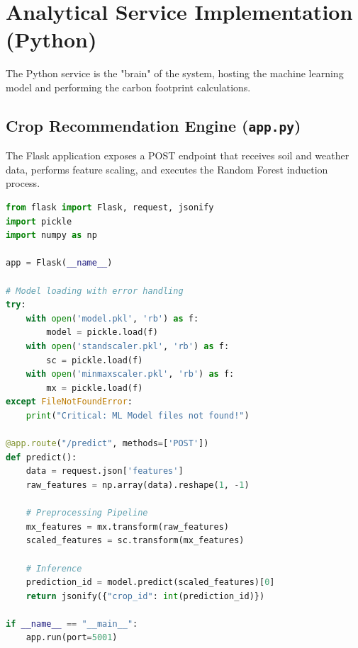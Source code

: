 \documentclass[12pt,a4paper]{report}
\begin{document}
\section{Analytical Service Implementation (Python)}
The Python service is the "brain" of the system, hosting the machine learning model and performing the carbon footprint calculations.

\subsection{Crop Recommendation Engine (\texttt{app.py})}
The Flask application exposes a POST endpoint that receives soil and weather data, performs feature scaling, and executes the Random Forest induction process.
\begin{lstlisting}[language=Python, caption=Flask Integration with Random Forest]
from flask import Flask, request, jsonify
import pickle
import numpy as np

app = Flask(__name__)

# Model loading with error handling
try:
    with open('model.pkl', 'rb') as f:
        model = pickle.load(f)
    with open('standscaler.pkl', 'rb') as f:
        sc = pickle.load(f)
    with open('minmaxscaler.pkl', 'rb') as f:
        mx = pickle.load(f)
except FileNotFoundError:
    print("Critical: ML Model files not found!")

@app.route("/predict", methods=['POST'])
def predict():
    data = request.json['features']
    raw_features = np.array(data).reshape(1, -1)
    
    # Preprocessing Pipeline
    mx_features = mx.transform(raw_features)
    scaled_features = sc.transform(mx_features)
    
    # Inference
    prediction_id = model.predict(scaled_features)[0]
    return jsonify({"crop_id": int(prediction_id)})

if __name__ == "__main__":
    app.run(port=5001)
\end{lstlisting}
\end{document}
